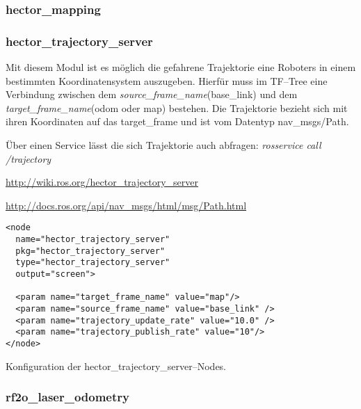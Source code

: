 \subsubsection{hector\_mapping}



\begin{comment}
--------------------------------------------------------------------------------
\end{comment}
\subsubsection{hector\_trajectory\_server}

Mit diesem Modul ist es möglich die gefahrene Trajektorie eine Roboters in einem bestimmten Koordinatensystem auszugeben. Hierfür muss im TF--Tree eine Verbindung zwischen dem \textit{source\_frame\_name}(base\_link) und dem \textit{target\_frame\_name}(odom oder map) bestehen. Die Trajektorie bezieht sich mit ihren Koordinaten auf das target\_frame und ist vom Datentyp nav\_msgs/Path.

Über einen Service lässt die sich Trajektorie auch abfragen: \textit{rosservice call /trajectory}

\url{http://wiki.ros.org/hector_trajectory_server}

\url{http://docs.ros.org/api/nav_msgs/html/msg/Path.html}

\begin{listing}
	\begin{verbatim}
<node 
  name="hector_trajectory_server"
  pkg="hector_trajectory_server"
  type="hector_trajectory_server"
  output="screen">

  <param name="target_frame_name" value="map"/>
  <param name="source_frame_name" value="base_link" />
  <param name="trajectory_update_rate" value="10.0" />
  <param name="trajectory_publish_rate" value="10"/>
</node>
	\end{verbatim}
	\unskip
	\caption{Konfiguration der hector\_trajectory\_server--Nodes.}
	\label{lst:hector_trajectory_server_node}
\end{listing}


\begin{comment}
--------------------------------------------------------------------------------
\end{comment}
\subsubsection{rf2o\_laser\_odometry}

